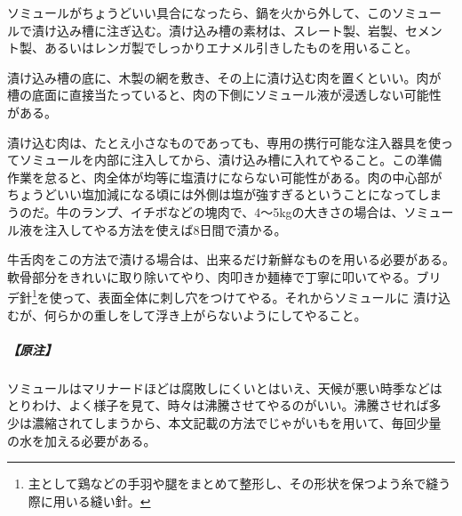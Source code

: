 \begin{recette}
ソミュールがちょうどいい具合になったら、鍋を火から外して、このソミュー
ルで漬け込み槽に注ぎ込む。漬け込み槽の素材は、スレート製、岩製、セメン
ト製、あるいはレンガ製でしっかりエナメル引きしたものを用いること。

漬け込み槽の底に、木製の網を敷き、その上に漬け込む肉を置くといい。肉が
槽の底面に直接当たっていると、肉の下側にソミュール液が浸透しない可能性
がある。

漬け込む肉は、たとえ小さなものであっても、専用の携行可能な注入器具を使っ
てソミュールを内部に注入してから、漬け込み槽に入れてやること。この準備
作業を怠ると、肉全体が均等に塩漬けにならない可能性がある。肉の中心部が
ちょうどいい塩加減になる頃には外側は塩が強すぎるということになってしま
うのだ。牛のランプ、イチボなどの塊肉で、4〜5kgの大きさの場合は、ソミュー
ル液を注入してやる方法を使えば8日間で漬かる。

牛舌肉をこの方法で漬ける場合は、出来るだけ新鮮なものを用いる必要がある。
軟骨部分をきれいに取り除いてやり、肉叩きか麺棒で丁寧に叩いてやる。ブリ
デ針\footnote{主として鶏などの手羽や腿をまとめて整形し、その形状を保つよう糸で縫う際に用いる縫い針。}を使って、表面全体に刺し穴をつけてやる。それからソミュールに
漬け込むが、何らかの重しをして浮き上がらないようにしてやること。

\hypertarget{observation-grande-saumure}{%
\subparagraph{【原注】}\label{observation-grande-saumure}}

ソミュールはマリナードほどは腐敗しにくいとはいえ、天候が悪い時季などは
とりわけ、よく様子を見て、時々は沸騰させてやるのがいい。沸騰させれば多
少は濃縮されてしまうから、本文記載の方法でじゃがいもを用いて、毎回少量
の水を加える必要がある。
\end{recette}